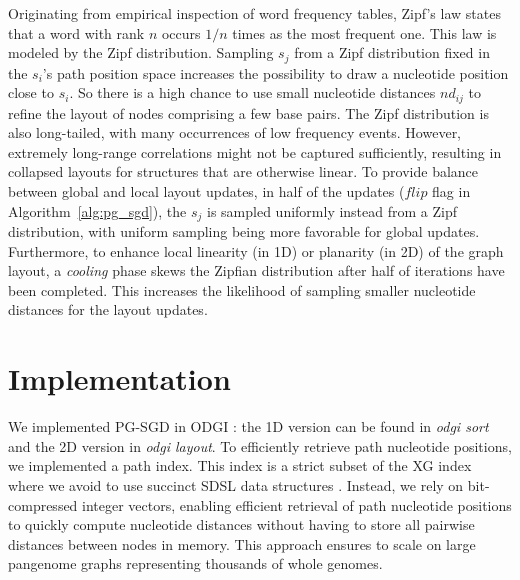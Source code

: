 \documentclass{bioinfo}
\theoremstyle{definition}
\begin{document}

	Originating from empirical inspection of word frequency tables, Zipf's law states that a word with rank $n$ occurs $1/n$ times as the most frequent one.
    This law is modeled by the Zipf distribution.%
	Sampling $s_j$ from a Zipf distribution fixed in the $s_i$'s path position space increases the possibility to draw a nucleotide position close to $s_i$.
	So there is a high chance to use small nucleotide distances $nd_{ij}$ to refine the layout of nodes comprising a few base pairs.
    The Zipf distribution is also long-tailed, with many occurrences of low frequency events.
	However, extremely long-range correlations might not be captured sufficiently, resulting in collapsed layouts for structures that are otherwise linear.
    To provide balance between global and local layout updates, in half of the updates ($flip$ flag in Algorithm~\ref{alg:pg_sgd}), the $s_j$ is sampled uniformly instead from a Zipf distribution, with uniform sampling being more favorable for global updates.
	Furthermore, to enhance local linearity (in 1D) or planarity (in 2D) of the graph layout, a \textit{cooling} phase skews the Zipfian distribution after half of iterations have been completed.
	This increases the likelihood of sampling smaller nucleotide distances for the layout updates.

	

	\section{Implementation}
	
	We implemented PG-SGD in ODGI \citep{Guarracino2022}: the 1D version can be found in \textit{odgi sort} and the 2D version in \textit{odgi layout}. %
	To efficiently retrieve path nucleotide positions, we implemented a path index.
	This index is a strict subset of the XG index~\citep{Garrison:2018} where we avoid to use succinct SDSL data structures \citep{Gog2014}.
	Instead, we rely on bit-compressed integer vectors, enabling efficient retrieval of path nucleotide positions to quickly compute nucleotide distances without having to store all pairwise distances between nodes in memory.
	This approach ensures to scale on large pangenome graphs representing thousands of whole genomes.
\end{document}
